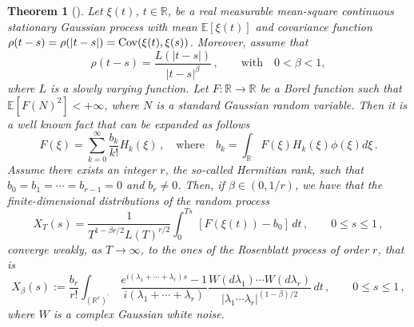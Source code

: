 \documentclass[10pt]{amsart}
\newtheorem{theo}{Theorem}[section]
\theoremstyle{definition}\newtheorem{defi}[theo]{Definition}\newtheorem{rema}[theo]{Remark}\newtheorem{exam}[theo]{Example}\newtheorem{exem}[theo]{Example}\newtheorem{nota}[theo]{Notation}
\newcommand{\bbR}{\mathbb{R}}
\newcommand{\bbE}{\mathbb{E}}
\begin{document}
\begin{theo}[{\cite{DM79, Ta:79}}]\label{DMtheorem}
Let $\xi(t)$, $t\in\bbR$, be a real measurable mean-square continuous stationary Gaussian process with mean $\bbE
\left[\xi(t)\right]$ and covariance function $\rho(t-s)=\rho(|t-s|)=
\mathop{\rm Cov}(\xi(t),\xi(s))$. Moreover, assume that
\begin{equation}\label{eq:DM79}
\rho(t-s)=\frac{L(|t-s|)}{|t-s|^{\beta}}\,, \qquad \text{with} \quad 0<\beta<1,
\end{equation}
where $L$ is a slowly varying function. Let $F: \bbR \rightarrow
\bbR$ be a Borel function such that $\bbE\left[F(N)^2\right] <+\infty$, where $N$ is a standard Gaussian random variable. Then it is a well known fact that can be expanded as follows
\begin{equation*}
F(\xi)=\sum_{k=0}^\infty \frac{b_k}{k!}H_k(\xi)\,, \quad \text{where} \quad b_k=\int_{\bbR}F(\xi)H_k(\xi)\phi(\xi)d\xi\,.
\end{equation*}
Assume there exists an integer $r$, the so-called Hermitian rank, such that $ b_0=b_1=\cdots=b_{r-1}=0$ and $b_r\ne0$. Then, if $\beta\in(0,1/r)$, we have that the finite-dimensional distributions of the random process
\begin{equation*}
X_T(s)=\frac{1}{T^{1-\beta r /2}L(T)^{r/2}}\int_{0}^{Ts}\,\left[F(\xi(t))-b_0
\right] \, dt \,, \qquad 0\le s \le1\,,
\end{equation*}
converge weakly, as $T\rightarrow \infty$, to the ones of the Rosenblatt process of order $r$, that is
\begin{equation*}
X_{\beta}(s):=\frac{b_r}{r!}\int_{(\bbR^r)^{\prime}}\,\frac{ e^{i(\lambda_1+\cdots+\lambda_r)s}-1}{i(\lambda_1+\cdots+\lambda_r)}\frac{ W(d\lambda_1)\cdots W(d\lambda_r)}{|\lambda_1\cdots\lambda_r|^{(1-\beta)/2}}
\, dt \,, \qquad 0\le s \le1\,,
\end{equation*}
where $W$ is a complex Gaussian white noise.
\end{theo}
\end{document}
